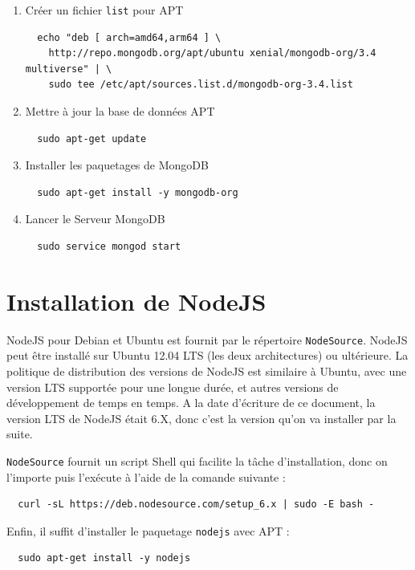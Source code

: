 \documentclass[a4paper,11pt,oneside]{report}
\begin{document}
\begin{appendices}
\begin{enumerate}
  \item{Créer un fichier \texttt{list} pour APT}
  \begin{verbatim}
  echo "deb [ arch=amd64,arm64 ] \ 
    http://repo.mongodb.org/apt/ubuntu xenial/mongodb-org/3.4 multiverse" | \ 
    sudo tee /etc/apt/sources.list.d/mongodb-org-3.4.list
  \end{verbatim}

  \item{Mettre à jour la base de données APT}
  \begin{verbatim}
  sudo apt-get update
  \end{verbatim}

  \item{Installer les paquetages de MongoDB}
  \begin{verbatim}
  sudo apt-get install -y mongodb-org
  \end{verbatim}

  \item{Lancer le Serveur MongoDB}
  \begin{verbatim}
  sudo service mongod start
  \end{verbatim}
\end{enumerate}

\newpage

\section{Installation de NodeJS}

NodeJS pour Debian et Ubuntu est fournit par le répertoire \texttt{NodeSource}. NodeJS peut être installé sur Ubuntu 12.04 LTS (les deux architectures) ou ultérieure. La politique de distribution des versions de NodeJS est similaire à Ubuntu, avec une version LTS supportée pour une longue durée, et autres versions de développement de temps en temps. A la date d'écriture de ce document, la version LTS de NodeJS était 6.X, donc c'est la version qu'on va installer par la suite.
\newline

\texttt{NodeSource} fournit un script Shell qui facilite la tâche d'installation, donc on l'importe puis l'exécute à l'aide de la comande suivante :
  \begin{verbatim}
  curl -sL https://deb.nodesource.com/setup_6.x | sudo -E bash -
  \end{verbatim}

Enfin, il suffit d'installer le paquetage \texttt{nodejs} avec APT :
  \begin{verbatim}
  sudo apt-get install -y nodejs
  \end{verbatim}


\end{appendices}
\end{document}
